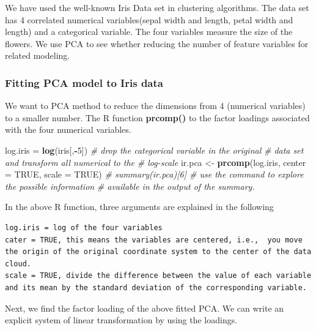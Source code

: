 \documentclass[
]{book}
\newenvironment{Shaded}{\begin{snugshade}}{\end{snugshade}}
\newcommand{\AttributeTok}[1]{\textcolor[rgb]{0.13,0.29,0.53}{#1}}
\newcommand{\CommentTok}[1]{\textcolor[rgb]{0.56,0.35,0.01}{\textit{#1}}}
\newcommand{\ConstantTok}[1]{\textcolor[rgb]{0.56,0.35,0.01}{#1}}
\newcommand{\DecValTok}[1]{\textcolor[rgb]{0.00,0.00,0.81}{#1}}
\newcommand{\FunctionTok}[1]{\textcolor[rgb]{0.13,0.29,0.53}{\textbf{#1}}}
\newcommand{\NormalTok}[1]{#1}
\newcommand{\OtherTok}[1]{\textcolor[rgb]{0.56,0.35,0.01}{#1}}
\newcommand{\SpecialCharTok}[1]{\textcolor[rgb]{0.81,0.36,0.00}{\textbf{#1}}}
\begin{document}
We have used the well-known Iris Data set in clustering algorithms. The data set has 4 correlated numerical variables(sepal width and length, petal width and length) and a categorical variable. The four variables measure the size of the flowers. We use PCA to see whether reducing the number of feature variables for related modeling.

\hypertarget{fitting-pca-model-to-iris-data}{%
\subsubsection{Fitting PCA model to Iris data}\label{fitting-pca-model-to-iris-data}}

We want to PCA method to reduce the dimensions from 4 (numerical variables) to a smaller number. The R function \textbf{prcomp()} to the factor loadings associated with the four numerical variables.

\begin{Shaded}
\begin{Highlighting}[]
\NormalTok{log.iris }\OtherTok{=} \FunctionTok{log}\NormalTok{(iris[,}\SpecialCharTok{{-}}\DecValTok{5}\NormalTok{])   }\CommentTok{\# drop the categorical variable in the original }
                            \CommentTok{\# data set and transform all numerical to the}
                            \CommentTok{\# log{-}scale}
\NormalTok{ir.pca }\OtherTok{\textless{}{-}} \FunctionTok{prcomp}\NormalTok{(log.iris, }\AttributeTok{center =} \ConstantTok{TRUE}\NormalTok{, }\AttributeTok{scale =} \ConstantTok{TRUE}\NormalTok{)}
\CommentTok{\# summary(ir.pca)[6]   \# use the command to explore the possible information}
                       \CommentTok{\# available in the output of the summary.}
\end{Highlighting}
\end{Shaded}

In the above R function, three arguments are explained in the following

\begin{verbatim}
log.iris = log of the four variables
cater = TRUE, this means the variables are centered, i.e.,  you move the origin of the original coordinate system to the center of the data cloud.
scale = TRUE, divide the difference between the value of each variable and its mean by the standard deviation of the corresponding variable. 
\end{verbatim}

Next, we find the factor loading of the above fitted PCA. We can write an explicit system of linear transformation by using the loadings.
\end{document}
